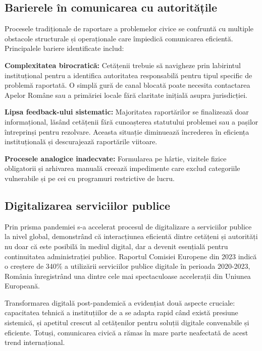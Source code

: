 \documentclass[12pt,a4paper]{report}
\begin{document}
\subsection{Barierele în comunicarea cu autoritățile}

Procesele tradiționale de raportare a problemelor civice se confruntă cu multiple obstacole structurale și operaționale care împiedică comunicarea eficientă. Principalele bariere identificate includ:

\textbf{Complexitatea birocratică:} Cetățenii trebuie să navigheze prin labirintul instituțional pentru a identifica autoritatea responsabilă pentru tipul specific de problemă raportată. O simplă gură de canal blocată poate necesita contactarea Apelor Române sau  a primăriei locale fără claritate inițială asupra jurisdicției.

\textbf{Lipsa feedback-ului sistematic:} Majoritatea raportărilor se finalizează doar   informațional, lăsând cetățenii fără cunoașterea statutului problemei sau a pașilor întreprinși pentru rezolvare. Aceasta situație diminuează încrederea în eficiența instituțională și descurajează raportările viitoare.

\textbf{Procesele analogice inadecvate:} Formularea pe hârtie, vizitele fizice obligatorii și arhivarea manuală creează impedimente care exclud categoriile vulnerabile și pe cei cu programuri restrictive de lucru.

\subsection{Digitalizarea serviciilor publice}

Prin prisma pandemiei s-a accelerat procesul de digitalizare a serviciilor publice la nivel global, demonstrând că interacțiunea eficientă dintre cetățeni și autorități nu doar că este posibilă în mediul digital, dar a devenit esențială pentru continuitatea administrației publice. Raportul Comisiei Europene din 2023 indică o creștere de 340\% a utilizării serviciilor publice digitale în perioada 2020-2023, România înregistrând una dintre cele mai spectaculoase accelerații din Uniunea Europeană.

Transformarea digitală post-pandemică a evidențiat două aspecte cruciale: capacitatea tehnică a instituțiilor de a se adapta rapid când există presiune sistemică, și apetitul crescut al cetățenilor pentru soluții digitale convenabile și eficiente. Totuși, comunicarea civică a rămas în mare parte neafectată de acest trend internațional.
\end{document}
